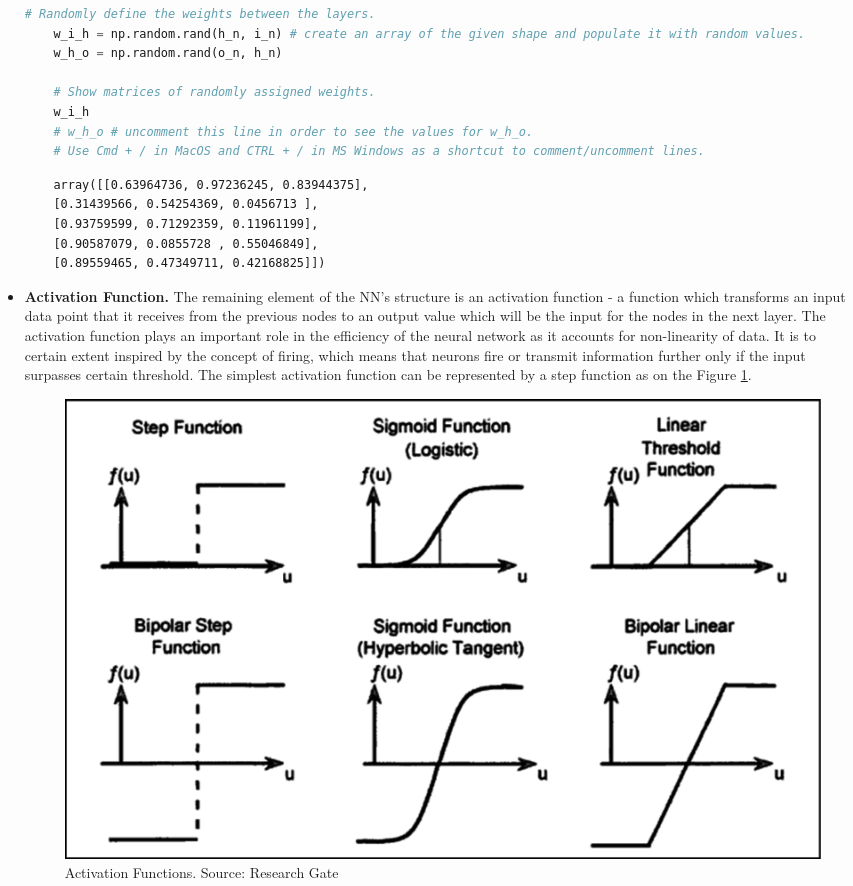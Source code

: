 \begin{itemize}
\begin{lstlisting}[language=Python]
    # Randomly define the weights between the layers. 
    w_i_h = np.random.rand(h_n, i_n) # create an array of the given shape and populate it with random values.
    w_h_o = np.random.rand(o_n, h_n) 
    
    # Show matrices of randomly assigned weights.
    w_i_h
    # w_h_o # uncomment this line in order to see the values for w_h_o.
    # Use Cmd + / in MacOS and CTRL + / in MS Windows as a shortcut to comment/uncomment lines.
\end{lstlisting}

\begin{lstlisting}
    array([[0.63964736, 0.97236245, 0.83944375],
    [0.31439566, 0.54254369, 0.0456713 ],
    [0.93759599, 0.71292359, 0.11961199],
    [0.90587079, 0.0855728 , 0.55046849],
    [0.89559465, 0.47349711, 0.42168825]])
\end{lstlisting}

\item \textbf{Activation Function.} The remaining element of the NN's structure is an activation function - a function which transforms an input data point that it receives from the previous nodes to an output value which will be the input for the nodes in the next layer. The activation function plays an important role in the efficiency of the neural network as it accounts for non-linearity of data. 
It is to certain extent inspired by the concept of firing, which means that neurons fire or transmit information further only if the input surpasses certain threshold. The simplest activation function can be represented by a step function as on the Figure \ref{fig:act-fct}. 

\begin{figure}[H]
    \includegraphics[width=\linewidth]{pics/step_function.png}
    \caption{\label{fig:act-fct} Activation Functions. Source: Research Gate}
\end{figure}


\end{itemize}
